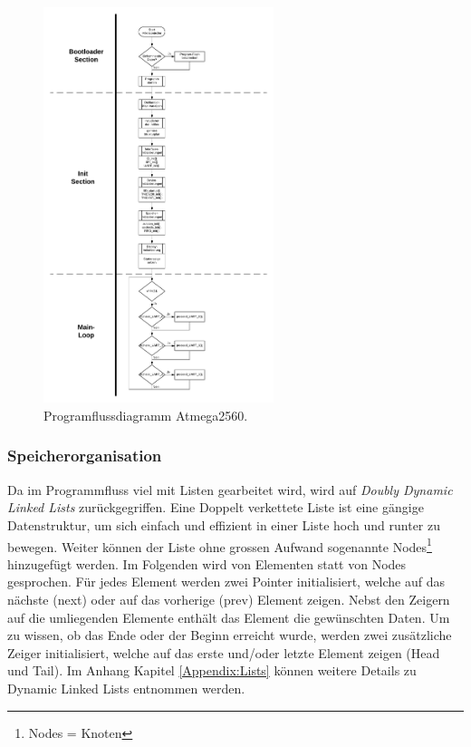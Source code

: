 
\newpage

\begin{figure}[h!]
	\centering
	\includegraphics[width=0.6\textwidth]{graphics/Programmfluss_Atmega2560.pdf}
	\caption{Programflussdiagramm Atmega2560.}
	\label{fig:Programmfluss_Atmega2560}
\end{figure}
\newpage


\subsubsection{Speicherorganisation}\label{subsubsec:Speicherorganisation}

Da im Programmfluss viel mit Listen gearbeitet wird, wird auf \textit{Doubly Dynamic Linked Lists} zurückgegriffen.
Eine Doppelt verkettete Liste ist eine gängige Datenstruktur, um sich einfach und effizient in einer Liste hoch und runter zu bewegen. Weiter können der Liste ohne grossen Aufwand sogenannte Nodes\footnote{Nodes = Knoten} hinzugefügt werden. Im Folgenden wird von Elementen statt von Nodes gesprochen. Für jedes Element werden zwei Pointer initialisiert, welche auf das nächste (next) oder auf das vorherige (prev) Element zeigen. Nebst den Zeigern auf die umliegenden Elemente enthält das Element die gewünschten Daten. Um zu wissen, ob das Ende oder der Beginn erreicht wurde, werden zwei zusätzliche Zeiger initialisiert, welche auf das erste und/oder letzte Element zeigen (Head und Tail). Im Anhang Kapitel \ref{Appendix:Lists} können weitere Details zu Dynamic Linked Lists entnommen werden.\cite{lenz_artikel_2016}

